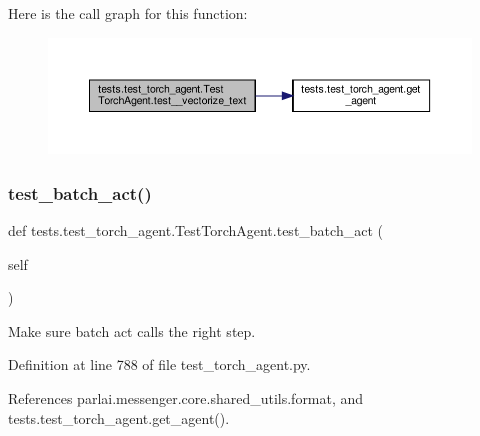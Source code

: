 Here is the call graph for this function\+:
\nopagebreak
\begin{figure}[H]
\begin{center}
\leavevmode
\includegraphics[width=350pt]{classtests_1_1test__torch__agent_1_1TestTorchAgent_a9bce672782a5d1408c104fd89d2d403f_cgraph}
\end{center}
\end{figure}
\mbox{\label{classtests_1_1test__torch__agent_1_1TestTorchAgent_aed82743e884c933453d912cfa8c7ec7f}} 
\subsubsection{\texorpdfstring{test\+\_\+batch\+\_\+act()}{test\_batch\_act()}}
{\footnotesize\ttfamily def tests.\+test\+\_\+torch\+\_\+agent.\+Test\+Torch\+Agent.\+test\+\_\+batch\+\_\+act (\begin{DoxyParamCaption}\item[{}]{self }\end{DoxyParamCaption})}

\begin{DoxyVerb}Make sure batch act calls the right step.\end{DoxyVerb}
 

Definition at line 788 of file test\+\_\+torch\+\_\+agent.\+py.



References parlai.\+messenger.\+core.\+shared\+\_\+utils.\+format, and tests.\+test\+\_\+torch\+\_\+agent.\+get\+\_\+agent().

